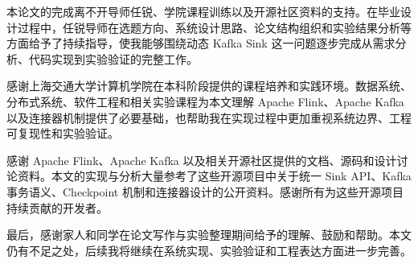 
\begin{acknowledgements}
  本论文的完成离不开导师任锐、学院课程训练以及开源社区资料的支持。在毕业设计过程中，任锐导师在选题方向、系统设计思路、论文结构组织和实验结果分析等方面给予了持续指导，使我能够围绕动态 Kafka Sink 这一问题逐步完成从需求分析、代码实现到实验验证的完整工作。

  感谢上海交通大学计算机学院在本科阶段提供的课程培养和实践环境。数据系统、分布式系统、软件工程和相关实验课程为本文理解 Apache Flink、Apache Kafka 以及连接器机制提供了必要基础，也帮助我在实现过程中更加重视系统边界、工程可复现性和实验验证。

  感谢 Apache Flink、Apache Kafka 以及相关开源社区提供的文档、源码和设计讨论资料。本文的实现与分析大量参考了这些开源项目中关于统一 Sink API、Kafka 事务语义、Checkpoint 机制和连接器设计的公开资料。感谢所有为这些开源项目持续贡献的开发者。

  最后，感谢家人和同学在论文写作与实验整理期间给予的理解、鼓励和帮助。本文仍有不足之处，后续我将继续在系统实现、实验验证和工程表达方面进一步完善。
\end{acknowledgements}
